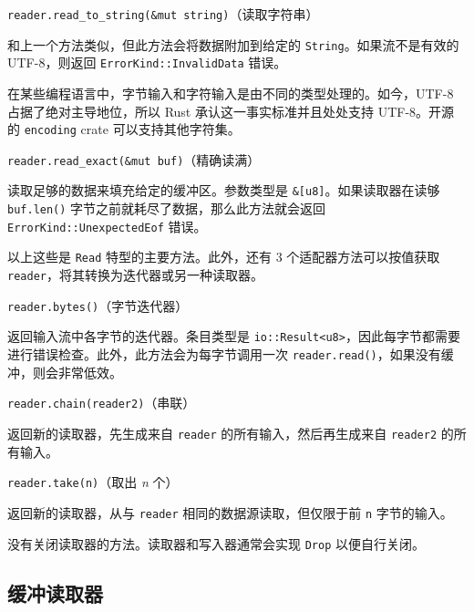 \begin{myNote}
\texttt{reader.read\_to\_string(\&mut string)}（读取字符串）
\end{myNote}

和上一个方法类似，但此方法会将数据附加到给定的 \texttt{String}。如果流不是有效的 UTF-8，则返回 \texttt{ErrorKind::InvalidData} 错误。

在某些编程语言中，字节输入和字符输入是由不同的类型处理的。如今，UTF-8 占据了绝对主导地位，所以 Rust 承认这一事实标准并且处处支持 UTF-8。开源的 \texttt{encoding} crate 可以支持其他字符集。

\begin{myNote}
\texttt{reader.read\_exact(\&mut buf)}（精确读满）
\end{myNote}

读取足够的数据来填充给定的缓冲区。参数类型是 \texttt{\&[u8]}。如果读取器在读够 \texttt{buf.len()} 字节之前就耗尽了数据，那么此方法就会返回 \texttt{ErrorKind::UnexpectedEof} 错误。

以上这些是 \texttt{Read} 特型的主要方法。此外，还有 3 个适配器方法可以按值获取 \texttt{reader}，将其转换为迭代器或另一种读取器。

\begin{mySidenote}
\texttt{reader.bytes()}（字节迭代器）
\end{mySidenote}

返回输入流中各字节的迭代器。条目类型是 \texttt{io::Result<u8>}，因此每字节都需要进行错误检查。此外，此方法会为每字节调用一次 \texttt{reader.read()}，如果没有缓冲，则会非常低效。

\begin{mySidenote}
\texttt{reader.chain(reader2)}（串联）
\end{mySidenote}

返回新的读取器，先生成来自 \texttt{reader} 的所有输入，然后再生成来自 \texttt{reader2} 的所有输入。

\begin{mySidenote}
\texttt{reader.take(n)}（取出 \emph{n} 个）
\end{mySidenote}

返回新的读取器，从与 \texttt{reader} 相同的数据源读取，但仅限于前 \texttt{n} 字节的输入。

没有关闭读取器的方法。读取器和写入器通常会实现 \texttt{Drop} 以便自行关闭。

\subsection{缓冲读取器}

